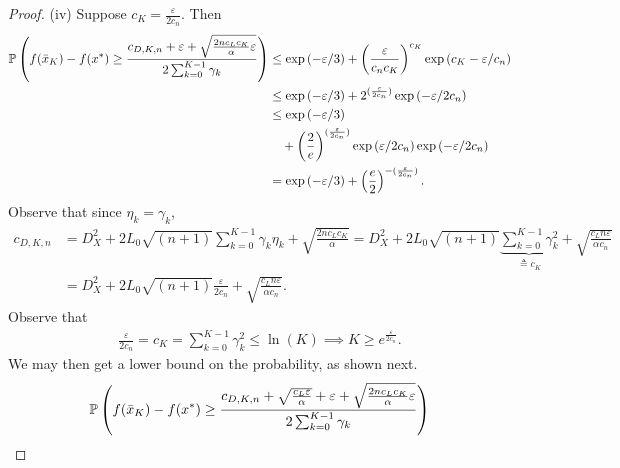 \documentclass[11pt,reqno]{amsart}
\newcommand{\1}{{\bf 1}}
\newcommand{\2}{{\bf 2}}
\newcommand{\al}{\alpha}
\numberwithin{equation}{section}
\theoremstyle{remark}
\begin{document}
{\begin{proof}
		\noindent (iv) Suppose $c_K = \frac{\varepsilon}{2c_n}.$ Then 
		\begin{align}
			\notag	\mathbb{P}\left(f(\bar{x}_K)-f(x^*)\geq \frac{c_{D,K,n}+\varepsilon+\sqrt{\frac{2nc_Lc_K}{\al}\varepsilon}}{2\sum_{k=0}^{K-1} \gamma_k}\right)& \leq \exp\left(-\varepsilon/3\right)+\left(\frac{\varepsilon}{c_nc_K}\right)^{c_K}\exp\left(c_K-\varepsilon/c_n\right) \\
			\notag  & \leq \exp\left(-\varepsilon/3\right)+2^{(\frac{\varepsilon}{2c_n})}\exp\left(-\varepsilon/2c_n\right) \\
			\notag & \leq \exp\left(-\varepsilon/3\right)\\
			\notag  &~~~+\left(\frac{2}{e}\right)^{(\frac{\varepsilon}{2c_n})}\exp\left(\varepsilon/2c_n\right)\exp\left(-\varepsilon/2c_n\right) \\
			\label{hp:b1}            & = \exp\left(-\varepsilon/3\right)+\left(\frac{e}{2}\right)^{-(\frac{\varepsilon}{2c_n})}.
		\end{align}
		Observe that since $\eta_k = \gamma_k$, \begin{align*}
			c_{D,K,n} & = D_X^2 + 2 L_0\sqrt{(n+1)}\sum_{k=0}^{K-1}\gamma_k \eta_k  +\sqrt{\frac{2nc_Lc_K}{\al}} 
			=D_X^2 + 2 L_0\sqrt{(n+1)}\underbrace{\sum_{k=0}^{K-1}\gamma_k^2}_{\triangleq c_K} + \sqrt{\frac{c_L n \varepsilon}{\al c_n}} \\
			& = D_X^2 + 2 L_0\sqrt{(n+1)}\frac{\varepsilon}{2c_n}+ \sqrt{\frac{c_Ln\varepsilon}{\al c_n}}. 
		\end{align*}
		Observe that 
		\begin{align}
			\frac{\varepsilon}{2c_n} = c_K = \sum_{k=0}^{K-1}\gamma_k^2 \le \ln(K) \implies K \ge e^{\frac{\varepsilon}{2c_n}}.  
		\end{align}
		We may then get a lower bound on the probability, as shown next.
		{\small
		\begin{align}
			\notag & \mathbb{P}\left(f(\bar{x}_K)-f(x^*)\geq \frac{c_{D,K,n}+\sqrt{\frac{c_L\varepsilon}{\al}}+\varepsilon+\sqrt{\frac{2nc_Lc_K}{\al}\varepsilon}}{2\sum_{k=0}^{K-1} \gamma_k}\right) \\

\end{align}}
\end{proof}}
\end{document}
